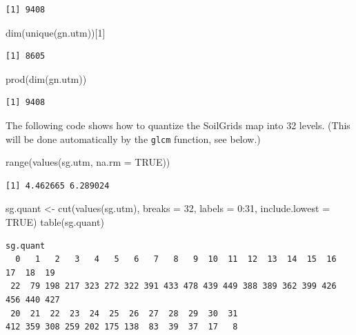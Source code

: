 \documentclass[
  letterpaper,
  DIV=11,
  numbers=noendperiod]{scrartcl}
\newenvironment{Shaded}{\begin{snugshade}}{\end{snugshade}}
\newcommand{\AttributeTok}[1]{\textcolor[rgb]{0.40,0.45,0.13}{#1}}
\newcommand{\ConstantTok}[1]{\textcolor[rgb]{0.56,0.35,0.01}{#1}}
\newcommand{\DecValTok}[1]{\textcolor[rgb]{0.68,0.00,0.00}{#1}}
\newcommand{\FunctionTok}[1]{\textcolor[rgb]{0.28,0.35,0.67}{#1}}
\newcommand{\NormalTok}[1]{\textcolor[rgb]{0.00,0.23,0.31}{#1}}
\newcommand{\OtherTok}[1]{\textcolor[rgb]{0.00,0.23,0.31}{#1}}
\newcommand{\SpecialCharTok}[1]{\textcolor[rgb]{0.37,0.37,0.37}{#1}}
\begin{document}
\begin{verbatim}
[1] 9408
\end{verbatim}

\begin{Shaded}
\begin{Highlighting}[]
\FunctionTok{dim}\NormalTok{(}\FunctionTok{unique}\NormalTok{(gn.utm))[}\DecValTok{1}\NormalTok{]}
\end{Highlighting}
\end{Shaded}

\begin{verbatim}
[1] 8605
\end{verbatim}

\begin{Shaded}
\begin{Highlighting}[]
\FunctionTok{prod}\NormalTok{(}\FunctionTok{dim}\NormalTok{(gn.utm))}
\end{Highlighting}
\end{Shaded}

\begin{verbatim}
[1] 9408
\end{verbatim}

The following code shows how to quantize the SoilGrids map into 32
levels. (This will be done automatically by the \texttt{glcm} function,
see below.)

\begin{Shaded}
\begin{Highlighting}[]
\FunctionTok{range}\NormalTok{(}\FunctionTok{values}\NormalTok{(sg.utm, }\AttributeTok{na.rm =} \ConstantTok{TRUE}\NormalTok{))}
\end{Highlighting}
\end{Shaded}

\begin{verbatim}
[1] 4.462665 6.289024
\end{verbatim}

\begin{Shaded}
\begin{Highlighting}[]
\NormalTok{sg.quant }\OtherTok{\textless{}{-}} \FunctionTok{cut}\NormalTok{(}\FunctionTok{values}\NormalTok{(sg.utm), }\AttributeTok{breaks =} \DecValTok{32}\NormalTok{, }\AttributeTok{labels =} \DecValTok{0}\SpecialCharTok{:}\DecValTok{31}\NormalTok{, }\AttributeTok{include.lowest =} \ConstantTok{TRUE}\NormalTok{)}
\FunctionTok{table}\NormalTok{(sg.quant)}
\end{Highlighting}
\end{Shaded}

\begin{verbatim}
sg.quant
  0   1   2   3   4   5   6   7   8   9  10  11  12  13  14  15  16  17  18  19 
 22  79 198 217 323 272 322 391 433 478 439 449 388 389 362 399 426 456 440 427 
 20  21  22  23  24  25  26  27  28  29  30  31 
412 359 308 259 202 175 138  83  39  37  17   8 
\end{verbatim}
\end{document}
